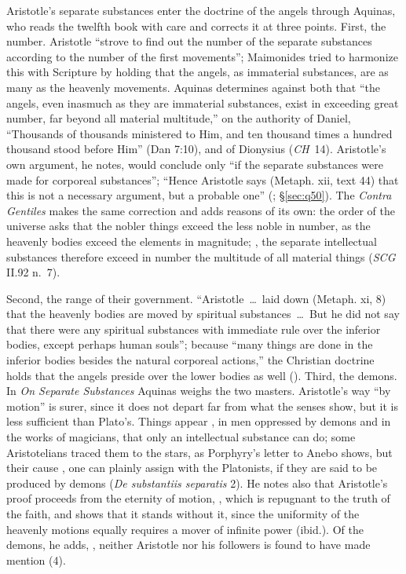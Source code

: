 Aristotle's separate substances enter the doctrine of the angels through
Aquinas, who reads the twelfth book with care and corrects it at three
points. First, the number. Aristotle ``strove to find out the number of
the separate substances according to the number of the first
movements''; Maimonides tried to harmonize this with Scripture by
holding that the angels, as immaterial substances, are as many as the
heavenly movements. Aquinas determines against both that ``the angels,
even inasmuch as they are immaterial substances, exist in exceeding
great number, far beyond all material multitude,'' on the authority of
Daniel, ``Thousands of thousands ministered to Him, and ten thousand
times a hundred thousand stood before Him'' (Dan 7:10), and of
Dionysius (\emph{CH}~14). Aristotle's own argument, he notes, would
conclude only ``if the separate substances were made for corporeal
substances''; ``Hence Aristotle says (Metaph. xii, text 44) that this
is not a necessary argument, but a probable one'' (; \S\ref{sec:q50}). The \emph{Contra Gentiles} makes the same
correction and adds reasons of its own: the order of the universe asks
that the nobler things exceed the less noble in number, as the heavenly
bodies exceed the elements in magnitude; , the separate intellectual substances therefore exceed in
number the multitude of all material things (\emph{SCG} II.92 n.~7).

Second, the range of their government. ``Aristotle~\dots\ laid down
(Metaph. xi, 8) that the heavenly bodies are moved by spiritual
substances~\dots\ But he did not say that there were any spiritual
substances with immediate rule over the inferior bodies, except perhaps
human souls''; because ``many things are done in the inferior bodies
besides the natural corporeal actions,'' the Christian doctrine holds
that the angels preside over the lower bodies as well (). Third, the demons. In \emph{On Separate Substances} Aquinas
weighs the two masters. Aristotle's way ``by motion'' is surer, since it
does not depart far from what the senses show, but it is less
sufficient than Plato's. Things appear , in men oppressed by
demons and in the works of magicians, that only an intellectual
substance can do; some Aristotelians traced them to the stars, as
Porphyry's letter to Anebo shows, but their cause , one can plainly assign with the Platonists, if they are said
to be produced by demons (\emph{De substantiis separatis} 2). He notes also that Aristotle's proof proceeds from the
eternity of motion, , which is
repugnant to the truth of the faith, and shows that it stands without
it, since the uniformity of the heavenly motions equally requires a
mover of infinite power (ibid.). Of the demons, he adds,
, neither Aristotle
nor his followers is found to have made mention (4).

